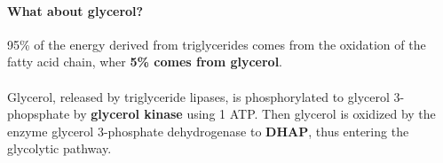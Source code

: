 \documentclass[../main.tex]{subfiles}
\begin{document}
\begin{figure}[H]
	\centering
	\hfil
	\caption{}
\end{figure}
 
\paragraph{What about glycerol?}
95\% of the energy derived from triglycerides comes from the oxidation of the fatty acid chain, wher \textbf{5\% comes from glycerol}.\\
\\
Glycerol, released by triglyceride lipases, is phosphorylated to glycerol 3-phopsphate by \textbf{glycerol kinase} using 1 ATP. Then glycerol is oxidized by the enzyme glycerol 3-phosphate dehydrogenase to \textbf{DHAP}, thus entering the glycolytic pathway. 
\end{document}
